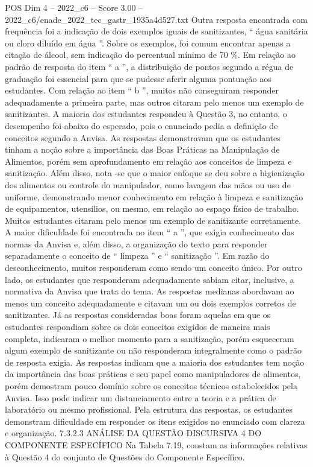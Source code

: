 \begin{textsample}{POS Dim 4 – 2022\_c6 – Score 3.00 – 2022\_c6/enade\_2022\_tec\_gastr\_1935a4d527.txt}
Outra resposta encontrada com frequência foi a indicação de dois exemplos iguais de sanitizantes, “ água sanitária ou cloro diluído em água ”.
Sobre os exemplos, foi comum encontrar apenas a citação de álcool, sem indicação do percentual mínimo de 70 \%.
Em relação ao padrão de resposta do item “ a ”, a distribuição de pontos segundo a régua de graduação foi essencial para que se pudesse aferir alguma pontuação aos estudantes.
Com relação ao item “ b ”, muitos não conseguiram responder adequadamente a primeira parte, mas outros citaram pelo menos um exemplo de sanitizantes.
A maioria dos estudantes respondeu à Questão 3, no entanto, o desempenho foi abaixo do esperado, pois o enunciado pedia a definição de conceitos segundo a Anvisa.
As respostas demonstravam que os estudantes tinham a noção sobre a importância das Boas Práticas na Manipulação de Alimentos, porém sem aprofundamento em relação aos conceitos de limpeza e sanitização.
Além disso, nota -se que o maior enfoque se deu sobre a higienização dos alimentos ou controle do manipulador, como lavagem das mãos ou uso de uniforme, demonstrando menor conhecimento em relação à limpeza e sanitização de equipamentos, utensílios, ou mesmo, em relação ao espaço físico de trabalho.
Muitos estudantes citaram pelo menos um exemplo de sanitizante corretamente.
A maior dificuldade foi encontrada no item “ a ”, que exigia conhecimento das normas da Anvisa e, além disso, a organização do texto para responder separadamente o conceito de “ limpeza ” e “ sanitização ”.
Em razão do desconhecimento, muitos responderam como sendo um conceito único.
Por outro lado, os estudantes que responderam adequadamente sabiam citar, inclusive, a normativa da Anvisa que trata do tema.
As respostas medianas abordavam ao menos um conceito adequadamente e citavam um ou dois exemplos corretos de sanitizantes.
Já as respostas consideradas boas foram aquelas em que os estudantes respondiam sobre os dois conceitos exigidos de maneira mais completa, indicaram o melhor momento para a sanitização, porém esqueceram algum exemplo de sanitizante ou não responderam integralmente como o padrão de resposta exigia.
As respostas indicam que a maioria dos estudantes tem noção da importância das boas práticas e seu papel como manipuladores de alimentos, porém demostram pouco domínio sobre os conceitos técnicos estabelecidos pela Anvisa.
Isso pode indicar um distanciamento entre a teoria e a prática de laboratório ou mesmo profissional.
Pela estrutura das respostas, os estudantes demonstram dificuldade em responder os itens exigidos no enunciado com clareza e organização. 7.3.2.3 ANÁLISE DA QUESTÃO DISCURSIVA 4 DO COMPONENTE ESPECÍFICO Na Tabela 7.19, constam as informações relativas à Questão 4 do conjunto de Questões do Componente Específico.

\end{textsample}
